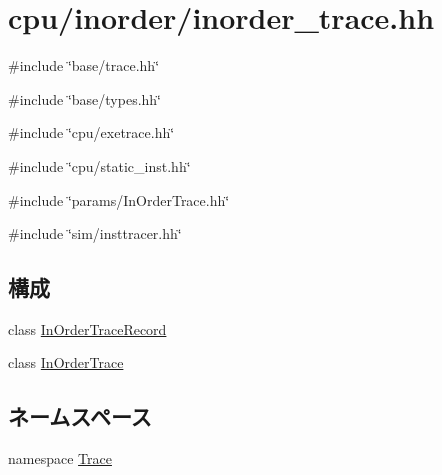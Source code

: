 \hypertarget{inorder__trace_8hh}{
\section{cpu/inorder/inorder\_\-trace.hh}
\label{inorder__trace_8hh}
}
{\ttfamily \#include \char`\"{}base/trace.hh\char`\"{}}\par
{\ttfamily \#include \char`\"{}base/types.hh\char`\"{}}\par
{\ttfamily \#include \char`\"{}cpu/exetrace.hh\char`\"{}}\par
{\ttfamily \#include \char`\"{}cpu/static\_\-inst.hh\char`\"{}}\par
{\ttfamily \#include \char`\"{}params/InOrderTrace.hh\char`\"{}}\par
{\ttfamily \#include \char`\"{}sim/insttracer.hh\char`\"{}}\par
\subsection*{構成}
\begin{DoxyCompactItemize}
\item 
class \hyperlink{classTrace_1_1InOrderTraceRecord}{InOrderTraceRecord}
\item 
class \hyperlink{classTrace_1_1InOrderTrace}{InOrderTrace}
\end{DoxyCompactItemize}
\subsection*{ネームスペース}
\begin{DoxyCompactItemize}
\item 
namespace \hyperlink{namespaceTrace}{Trace}
\end{DoxyCompactItemize}

